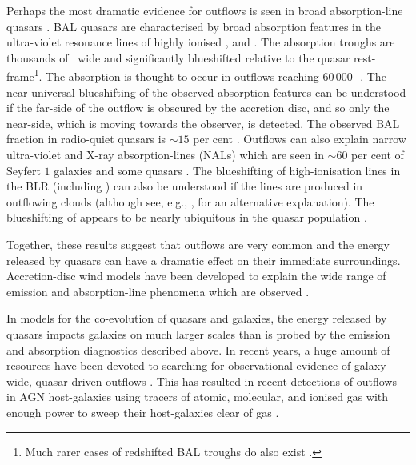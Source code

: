 Perhaps the most dramatic evidence for outflows is seen in broad absorption-line quasars \citep[BAL quasars;][]{weymann91}.
BAL quasars are characterised by broad absorption features in the ultra-violet resonance lines of highly ionised ,  and .
The absorption troughs are thousands of \kms\, wide and significantly blueshifted relative to the quasar rest-frame\footnote{Much rarer cases of redshifted BAL troughs do also exist \citep[e.g.][]{hall13}.}.
The absorption is thought to occur in outflows reaching $60\,000$\,\kms\, \citep[e.g.][]{turnshek88}.
The near-universal blueshifting of the observed absorption features can be understood if the far-side of the outflow is obscured by the accretion disc, and so only the near-side, which is moving towards the observer, is detected.
The observed  BAL fraction in radio-quiet quasars is $\sim15$ per cent \citep[e.g.][]{hewett03,reichard03}.
Outflows can also explain narrow ultra-violet and X-ray absorption-lines (NALs) which are seen in $\sim60$ per cent of Seyfert $1$ galaxies \citep{crenshaw99} and some quasars \citep[e.g.][]{hamann97}.
The blueshifting of high-ionisation lines in the BLR (including ) can also be understood if the lines are produced in outflowing clouds (although see, e.g., \citealt{gaskell16}, for an alternative explanation).
The blueshifting of  appears to be nearly ubiquitous in the quasar population \citep[e.g.][]{richards02,richards11}.

Together, these results suggest that outflows are very common and the energy released by quasars can have a dramatic effect on their immediate surroundings.
Accretion-disc wind models have been developed to explain the wide range of emission and absorption-line phenomena which are observed \citep[e.g.][]{murray95,elvis00,proga00,everett05}.

In models for the co-evolution of quasars and galaxies, the energy released by quasars impacts galaxies on much larger scales than is probed by the emission and absorption diagnostics described above.
In recent years, a huge amount of resources have been devoted to searching for observational evidence of galaxy-wide, quasar-driven outflows \citep[for recent reviews, see][]{alexander12,fabian12,heckman14}.
This has resulted in recent detections of outflows in AGN host-galaxies using tracers of atomic, molecular, and ionised gas with enough power to sweep their host-galaxies clear of gas \citep[e.g.][]{nesvadba06,arav08,nesvadba08,moe09,dunn10,alexander10,harrison12,harrison14,nesvadba10,rupke13,veilleux13,nardini15,feruglio10,alatalo11,cimatti13,cicone14}.


